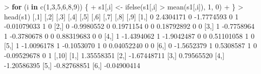 \documentclass[
]{article}
\newenvironment{Shaded}{\begin{snugshade}}{\end{snugshade}}
\newcommand{\ControlFlowTok}[1]{\textcolor[rgb]{0.13,0.29,0.53}{\textbf{#1}}}
\newcommand{\DecValTok}[1]{\textcolor[rgb]{0.00,0.00,0.81}{#1}}
\newcommand{\FloatTok}[1]{\textcolor[rgb]{0.00,0.00,0.81}{#1}}
\newcommand{\FunctionTok}[1]{\textcolor[rgb]{0.00,0.00,0.00}{#1}}
\newcommand{\NormalTok}[1]{#1}
\newcommand{\OtherTok}[1]{\textcolor[rgb]{0.56,0.35,0.01}{#1}}
\newcommand{\SpecialCharTok}[1]{\textcolor[rgb]{0.00,0.00,0.00}{#1}}
\begin{document}
\begin{Shaded}
\begin{Highlighting}[]
\SpecialCharTok{\textgreater{}} \ControlFlowTok{for}\NormalTok{ (i }\ControlFlowTok{in} \FunctionTok{c}\NormalTok{(}\DecValTok{1}\NormalTok{,}\DecValTok{3}\NormalTok{,}\DecValTok{5}\NormalTok{,}\DecValTok{6}\NormalTok{,}\DecValTok{8}\NormalTok{,}\DecValTok{9}\NormalTok{)) \{}
\SpecialCharTok{+}\NormalTok{   s1[,i] }\OtherTok{\textless{}{-}} \FunctionTok{ifelse}\NormalTok{(s1[,i] }\SpecialCharTok{\textgreater{}} \FunctionTok{mean}\NormalTok{(s1[,i]), }\DecValTok{1}\NormalTok{, }\DecValTok{0}\NormalTok{)}
\SpecialCharTok{+}\NormalTok{ \}}
\SpecialCharTok{\textgreater{}} \FunctionTok{head}\NormalTok{(s1)}
\NormalTok{     [,}\DecValTok{1}\NormalTok{]       [,}\DecValTok{2}\NormalTok{] [,}\DecValTok{3}\NormalTok{]       [,}\DecValTok{4}\NormalTok{] [,}\DecValTok{5}\NormalTok{] [,}\DecValTok{6}\NormalTok{]        [,}\DecValTok{7}\NormalTok{] [,}\DecValTok{8}\NormalTok{] [,}\DecValTok{9}\NormalTok{]}
\NormalTok{[}\DecValTok{1}\NormalTok{,]    }\DecValTok{0}  \FloatTok{2.4304171}    \DecValTok{0} \SpecialCharTok{{-}}\FloatTok{1.7774593}    \DecValTok{0}    \DecValTok{1} \SpecialCharTok{{-}}\FloatTok{0.01079033}    \DecValTok{1}    \DecValTok{0}
\NormalTok{[}\DecValTok{2}\NormalTok{,]    }\DecValTok{0} \SpecialCharTok{{-}}\FloatTok{0.9980552}    \DecValTok{0}  \FloatTok{0.1971154}    \DecValTok{0}    \DecValTok{0}  \FloatTok{0.18792892}    \DecValTok{0}    \DecValTok{0}
\NormalTok{[}\DecValTok{3}\NormalTok{,]    }\DecValTok{1} \SpecialCharTok{{-}}\FloatTok{0.7758964}    \DecValTok{1} \SpecialCharTok{{-}}\FloatTok{0.3780678}    \DecValTok{0}    \DecValTok{0}  \FloatTok{0.88319683}    \DecValTok{0}    \DecValTok{0}
\NormalTok{[}\DecValTok{4}\NormalTok{,]    }\DecValTok{1} \SpecialCharTok{{-}}\FloatTok{1.4394062}    \DecValTok{1} \SpecialCharTok{{-}}\FloatTok{1.9042487}    \DecValTok{0}    \DecValTok{0}  \FloatTok{0.51101058}    \DecValTok{1}    \DecValTok{0}
\NormalTok{[}\DecValTok{5}\NormalTok{,]    }\DecValTok{1} \SpecialCharTok{{-}}\FloatTok{1.0096178}    \DecValTok{1} \SpecialCharTok{{-}}\FloatTok{0.1053070}    \DecValTok{1}    \DecValTok{0}  \FloatTok{0.04052240}    \DecValTok{0}    \DecValTok{0}
\NormalTok{[}\DecValTok{6}\NormalTok{,]    }\DecValTok{0} \SpecialCharTok{{-}}\FloatTok{1.5652379}    \DecValTok{1}  \FloatTok{0.5308587}    \DecValTok{1}    \DecValTok{0} \SpecialCharTok{{-}}\FloatTok{0.09529678}    \DecValTok{0}    \DecValTok{1}
\NormalTok{           [,}\DecValTok{10}\NormalTok{]}
\NormalTok{[}\DecValTok{1}\NormalTok{,]  }\FloatTok{1.35558351}
\NormalTok{[}\DecValTok{2}\NormalTok{,] }\SpecialCharTok{{-}}\FloatTok{1.67448711}
\NormalTok{[}\DecValTok{3}\NormalTok{,]  }\FloatTok{0.79565520}
\NormalTok{[}\DecValTok{4}\NormalTok{,] }\SpecialCharTok{{-}}\FloatTok{1.20586395}
\NormalTok{[}\DecValTok{5}\NormalTok{,] }\SpecialCharTok{{-}}\FloatTok{0.82768851}
\NormalTok{[}\DecValTok{6}\NormalTok{,] }\SpecialCharTok{{-}}\FloatTok{0.04900414}
\end{Highlighting}
\end{Shaded}
\end{document}
